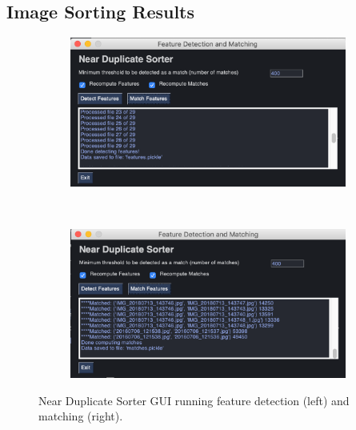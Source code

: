 \documentclass[12pt]{article}
\begin{document}
\subsection{Image Sorting Results}

\begin{figure}[H]
	\centering
	\begin{subfigure}[b]{.5\textwidth}
	\includegraphics[width=1\textwidth]{images/near_duplicate_GUI1.png}
	\end{subfigure}%
	~
	\begin{subfigure}[b]{.5\textwidth}
		\includegraphics[width=1\textwidth]{images/near_duplicate_GUI2.png}
	\end{subfigure}

	\caption{Near Duplicate Sorter GUI running feature detection (left) and matching (right).}
		\label{fig:sort_gui}
\end{figure}
\end{document}
